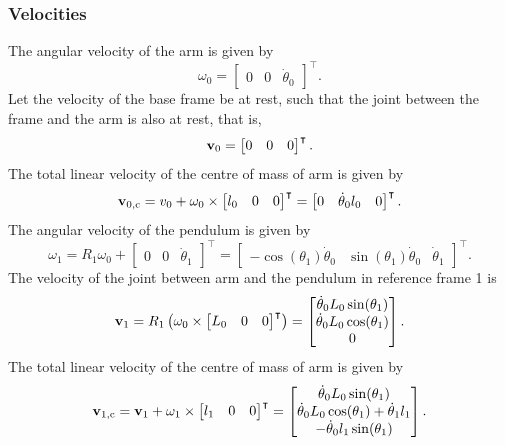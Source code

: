 \subsubsection{Velocities}
The angular velocity of the arm is given by
\begin{equation}
	\omega_0 = 	\begin{bmatrix}
					0 & 0 & \dot{\theta}_0
				\end{bmatrix}^\intercal.
\end{equation}
Let the velocity of the base frame be at rest, such that the joint
between the frame and the arm is also at rest, that is,
\begin{equation}
	\text{\textbf{v}}_0 = 	\begin{bmatrix}
					0 & 0 & 0
			\end{bmatrix}^\intercal.
\end{equation}
The total linear velocity of the centre of mass of arm is
given by
\begin{equation}
	\text{\textbf{v}}_{0, \text{c}} = v_0+\omega_0\times\begin{bmatrix}
					l_0 & 0 & 0
				\end{bmatrix}^\intercal = \begin{bmatrix}
				0 & \dot{\theta}_0l_0 & 0
				\end{bmatrix}^\intercal.
\end{equation}
The angular velocity of the pendulum is given by
\begin{equation}
\omega_1 = R_1\omega_0 + \begin{bmatrix}
				0 & 0 & \dot{\theta}_1
			\end{bmatrix}^\intercal = 
			\begin{bmatrix}
				-\cos(\theta_1)\dot{\theta}_0 & \sin(\theta_1)\dot{\theta}_0 & \dot{\theta}_1
			\end{bmatrix}^\intercal.
\end{equation}
The velocity of the joint between arm and the pendulum in
reference frame 1 is
\begin{equation}
	\text{\textbf{v}}_{1} = R_1\left( \omega_0\times	\begin{bmatrix}
									L_0 & 0 & 0
									\end{bmatrix}^\intercal \right) = 
	\begin{bmatrix}
		\dot{\theta}_0L_0\sin(\theta_1)\\
		\dot{\theta}_0L_0\cos(\theta_1)\\
		0
	\end{bmatrix}.
\end{equation}
The total linear velocity of the centre of mass of arm is
given by
\begin{equation}
	\text{\textbf{v}}_{1,\text{c}} = \text{\textbf{v}}_1+\omega_1\times
		\begin{bmatrix}
			l_1 & 0& 0
		\end{bmatrix}^\intercal=
	\begin{bmatrix}
		\dot{\theta}_0L_0\sin(\theta_1)\\
		\dot{\theta}_0L_0\cos(\theta_1) + \dot{\theta}_1l_1\\
		-\dot{\theta}_0l_1\sin(\theta_1)
	\end{bmatrix}.														
\end{equation}
